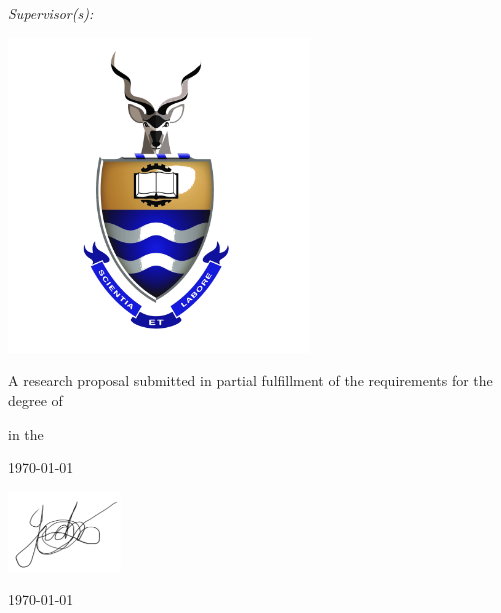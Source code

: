 \documentclass[
12pt, %
oneside, %
english, %
onehalfspacing, %
nolistspacing, %
liststotoc, %
headsepline, %
]{ProposalAndThesis} %
\begin{document}
\begin{titlepage}
\begin{center}

{\huge \bfseries \ttitle}\par\vspace{0.4cm} %
\HRule\par\vspace{1.5cm}
\authorname\par\vspace{1cm}
\emph{Supervisor(s):}\par
\par\vspace{0.5cm}

\includegraphics[width=80mm]{Figures/logoWitsstackedcolourtransparent.png} %
\vfill

A research proposal submitted in partial fulfillment of the requirements for the degree of \degreename\par\vspace{0.3cm}
in the\par\vspace{0.4cm}
\deptname\par\vspace{0.1cm} %
\univname\par\vspace{0.4cm} %
\cleanlookdateon
\today %

\end{center}

\end{titlepage}

\par\vspace{2cm}
\begin{flushright}
\includegraphics[width=30mm]{Figures/sign.png}\par 
\authorname\par\vspace{0.1cm}
\today
\end{flushright}
\end{document}

